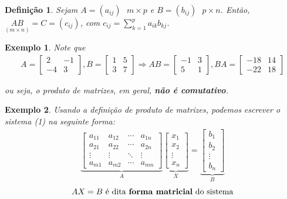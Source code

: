 \documentclass{article}
\newtheorem*{definition}{Definição}
\newtheorem*{example}{Exemplo}
\begin{document}
\begin{definition}
	Sejam $A = (a_{ij}) \text{ }m\times p$ e $B = (b_{ij})\text{ }{} p\times n$. Então, $\underset{(m\times n)}{AB} = C = (c_{ij})$, com $\displaystyle{c_{ij} = \sum_{k=1}^{p}a_{ik}b_{kj}}$.
\end{definition}

\begin{example}
	Note que
	\begin{align*}
	A = \begin{bmatrix}
	2 & -1 \\
	-4 & 3
	\end{bmatrix}, B = \begin{bmatrix}
	1 & 5 \\
	3 & 7
	\end{bmatrix}\Rightarrow AB = \begin{bmatrix}
	-1 & 3 \\
	5 & 1
	\end{bmatrix}, BA = \begin{bmatrix}
	-18 & 14 \\
	-22 & 18
	\end{bmatrix}
	\end{align*}
	\par\vspace{0.3cm} ou seja, o produto de matrizes, em geral, \textbf{não é comutativo}.
\end{example}

\begin{example}
	Usando a definição de produto de matrizes, podemos escrever o sistema (1) na seguinte forma:\begin{align*}
	\underbrace{ \begin{bmatrix}
	a_{11} & a_{12} & \cdots & a_{1n} \\
	a_{21} & a_{22} & \cdots & a_{2n} \\
	\vdots & \vdots & \ddots & \vdots \\
	a_{m1} & a_{m2} & \cdots & a_{mn}
	\end{bmatrix}}_{A}\underbrace{\begin{bmatrix}
	x_1 \\
	x_2 \\
	\vdots \\
	x_n 
	\end{bmatrix}}_{X} = \underbrace{\begin{bmatrix}
	b_1 \\
	b_2 \\
	\vdots \\
	b_n
	\end{bmatrix}}_{B}
	\end{align*}
	\begin{equation*}
	AX = B \text{ é dita \textbf{forma matricial} do sistema}
	\end{equation*}
\end{example}
\end{document}
